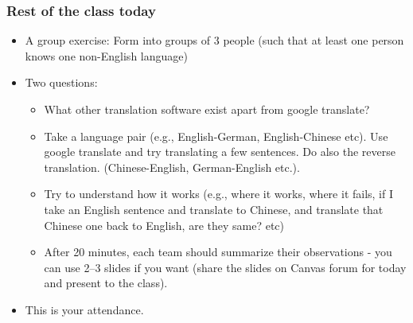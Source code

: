 \documentclass{beamer}
\begin{document}
\begin{frame}
\frametitle{Rest of the class today}
\begin{itemize}
\item A group exercise: Form into groups of 3 people (such that at least one person knows one non-English language)
\item Two questions:
\begin{itemize}
\item What other translation software exist apart from google translate?
\item Take a language pair (e.g., English-German, English-Chinese etc). Use google translate and try translating a few sentences. Do also the reverse translation. (Chinese-English, German-English etc.).
\item Try to understand how it works (e.g., where it works, where it fails, if I take an English sentence and translate to Chinese, and translate that Chinese one back to English, are they same? etc) 
\item After 20 minutes, each team should summarize their observations - you can use 2--3 slides if you want (share the slides on Canvas forum for today and present to the class).
\end{itemize}
\item This is your attendance. 
\end{itemize}
\end{frame}
\end{document}
